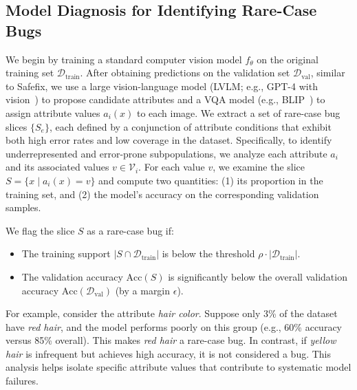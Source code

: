 \documentclass[10pt]{article} %
\newcommand{\hibug}{Safefix\xspace}
\begin{document}
\subsection{Model Diagnosis for Identifying Rare-Case Bugs}
We begin by training a standard computer vision model \(f_\theta\) on the original training set \(\mathcal{D}_{\mathrm{train}}\). After obtaining predictions on the validation set \(\mathcal{D}_{\mathrm{val}}\), similar to \hibug{}, we use a large vision-language model (LVLM; e.g., GPT-4 with vision~\citep{openai2023gpt4}) to propose candidate attributes and a VQA model (e.g., BLIP~\citep{li2022blip}) to assign attribute values \(a_i(x)\) to each image. We extract a set of rare-case bug slices \(\{S_e\}\), each defined by a conjunction of attribute conditions that exhibit both high error rates and low coverage in the dataset. Specifically, to identify underrepresented and error-prone subpopulations, we analyze each attribute \(a_i\) and its associated values \(v \in \mathcal{V}_i\). For each value \(v\), we examine the slice \(S = \{x \mid a_i(x) = v\}\) and compute two quantities: (1) its proportion in the training set, and (2) the model’s accuracy on the corresponding validation samples.

\noindent We flag the slice \(S\) as a rare-case bug if:
\begin{itemize}
    \item The training support \(|S \cap \mathcal{D}_{\mathrm{train}}|\) is below the threshold \(\rho \cdot |\mathcal{D}_{\mathrm{train}}|\).
    \item The validation accuracy \(\mathrm{Acc}(S)\) is significantly below the overall validation accuracy \(\mathrm{Acc}(\mathcal{D}_{\mathrm{val}})\) (by a margin \(\epsilon\)).
\end{itemize}
For example, consider the attribute \textit{hair color}. Suppose only 3\% of the dataset have \textit{red hair}, and the model performs poorly on this group (e.g., 60\% accuracy versus 85\% overall). This makes \textit{red hair} a rare-case bug. In contrast, if \textit{yellow hair} is infrequent but achieves high accuracy, it is not considered a bug. This analysis helps isolate specific attribute values that contribute to systematic model failures.

\end{document}
